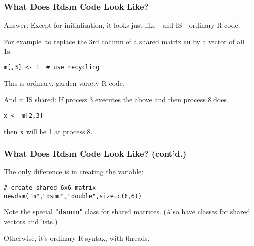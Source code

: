 \documentclass{beamer}
\begin{document}
\begin{frame}[fragile]
\frametitle{What Does Rdsm Code Look Like?}
\pause

Answer:  Except for initialization, it looks just like---and
IS---ordinary R code.
\pause

For example, to replace the 3rd column of a shared matrix {\bf m} by a
vector of all 1s:

\begin{verbatim}
m[,3] <- 1  # use recycling
\end{verbatim}
\pause

This is ordinary, garden-variety R code.
\pause

And it IS shared: If process 3 executes the above and then process 8
does

\begin{verbatim}
x <- m[2,3]
\end{verbatim}

then {\bf x} will be 1 at process 8.

\end{frame}

\begin{frame}[fragile]
\frametitle{What Does Rdsm Code Look Like? (cont'd.)}

The only difference is in creating the variable:
\pause

\begin{verbatim}
# create shared 6x6 matrix
newdsm("m","dsmm","double",size=c(6,6))  
\end{verbatim}

Note the special {\bf "dsmm"} class for shared matrices.
\pause
(Also have classes for shared vectors and lists.)
\pause

Otherwise, it's ordinary R syntax, with threads.

\end{frame}
\end{document}
